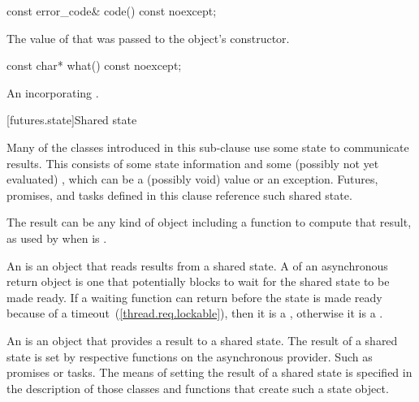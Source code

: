 %
%
\begin{itemdecl}
const error_code& code() const noexcept;
\end{itemdecl}

\begin{itemdescr}
\pnum
\returns The value of  that was passed to the object's constructor.
\end{itemdescr}

%
%
\begin{itemdecl}
const char* what() const noexcept;
\end{itemdecl}

\begin{itemdescr}
\pnum
\returns An \ntbs incorporating .
\end{itemdescr}

[futures.state]{Shared state}

\pnum
Many of the classes introduced in this sub-clause use some state to communicate results. This
 consists of some state information and some (possibly not
yet evaluated) , which can be a (possibly void) value or an exception. \enternote
Futures, promises, and tasks defined in this clause reference such shared state. \exitnote

\pnum
\enternote The result can be any kind of object including a function to compute that result,
as used by  when  is . \exitnote

\pnum
An  is an object that reads results from a
shared state. A  of an asynchronous return object is one
that potentially blocks to wait for the shared state to be made
ready.
If a waiting function can return before the state is made ready because of a
timeout~(\ref{thread.req.lockable}), then it is a , otherwise
it is a .

\pnum
An  is an object that provides a result to a shared
state.
The result of a shared state is set by
respective functions on the asynchronous provider. \enternote Such as promises or tasks.
\exitnote The means of setting the result of a shared state is specified
in the description of those classes and functions that create such a state object.

